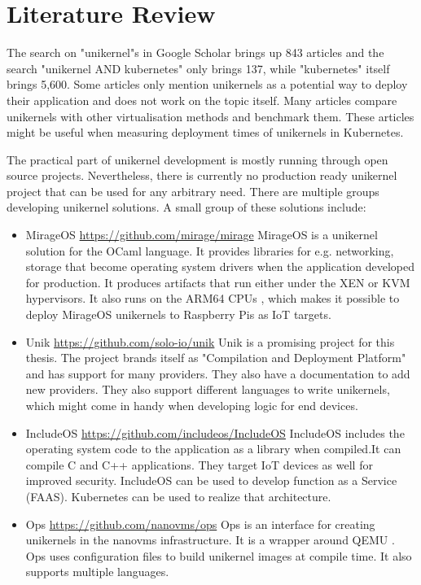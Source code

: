 
\chapter{Literature Review}\label{chapter:literature}
 The search on "unikernel"s in Google Scholar brings up 843 articles and the search "unikernel AND kubernetes" only brings 137, while "kubernetes" itself brings 5,600. Some articles only mention unikernels as a potential way to deploy their application and does not work on the topic itself. Many articles compare unikernels with other virtualisation methods and benchmark them. These articles might be useful when measuring deployment times of unikernels in Kubernetes.
 
The practical part of unikernel development is mostly running through open source projects. Nevertheless, there is currently no production ready unikernel project that can be used for any arbitrary need. There are multiple groups developing unikernel solutions. A small group of these solutions include: 
\begin{itemize}
  \item MirageOS \url{https://github.com/mirage/mirage} \cite{madhavapeddy2014unikernels}
  MirageOS is a unikernel solution for the OCaml language. It provides libraries for e.g. networking, storage that become operating system drivers when the application developed for production. It produces artifacts that run either under the XEN or KVM hypervisors. It also runs on the ARM64 CPUs , which makes it possible to deploy MirageOS unikernels to Raspberry Pis as IoT targets. 
  \item Unik \url{https://github.com/solo-io/unik}\cite{levine2016unik}
  Unik is a promising project for this thesis. The project brands itself as "Compilation and Deployment Platform" and has support for many providers. They also have a documentation to add new providers. They also support different languages to write unikernels, which might come in handy when developing logic for end devices.
  \item IncludeOS \url{https://github.com/includeos/IncludeOS} \cite{7396164}
  IncludeOS includes the operating system code to the application as a library when compiled.It can compile C and C++ applications. They target IoT devices as well for improved security. IncludeOS can be used to develop function as a Service (FAAS). Kubernetes can be used to realize that architecture. 
  \item Ops \url{https://github.com/nanovms/ops}
  Ops is an interface for creating unikernels in the nanovms infrastructure. \cite{nanovms} It is a wrapper around QEMU \cite{qemu}. Ops uses configuration files to build unikernel images at compile time. It also supports multiple languages.
\end{itemize}


